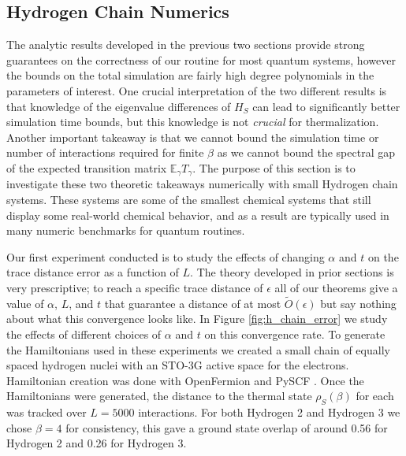 \documentclass[
 amsmath,amssymb,
 aps,
onecolumn, 
nofootinbib]{revtex4-2}
\newcommand{\EE}{\mathbb{E}}
\newcommand{\bigotilde}[1]{\widetilde{O} \left( #1 \right)}
\begin{document}
\subsection{Hydrogen Chain Numerics} \label{sec:general_numerics}

The analytic results developed in the previous two sections provide strong guarantees on the correctness of our routine for most quantum systems, however the bounds on the total simulation are fairly high degree polynomials in the parameters of interest. One crucial interpretation of the two different results is that knowledge of the eigenvalue differences of $H_S$ can lead to significantly better simulation time bounds, but this knowledge is not \emph{crucial} for thermalization. Another important takeaway is that we cannot bound the simulation time or number of interactions required for finite $\beta$ as we cannot bound the spectral gap of the expected transition matrix $\EE_\gamma T_\gamma$. The purpose of this section is to investigate these two theoretic takeaways numerically with small Hydrogen chain systems. These systems are some of the smallest chemical systems that still display some real-world chemical behavior, and as a result are typically used in many numeric benchmarks for quantum routines. 

Our first experiment conducted is to study the effects of changing $\alpha$ and $t$ on the trace distance error as a function of $L$. The theory developed in prior sections is very prescriptive; to reach a specific trace distance of $\epsilon$ all of our theorems give a value of $\alpha$, $L$, and $t$ that guarantee a distance of at most $\bigotilde{\epsilon}$ but say nothing about what this convergence looks like. In Figure \ref{fig:h_chain_error} we study the effects of different choices of $\alpha$ and $t$ on this convergence rate. To generate the Hamiltonians used in these experiments we created a small chain of equally spaced hydrogen nuclei with an STO-3G active space for the electrons. Hamiltonian creation was done with OpenFermion \cite{mcclean2020openfermion} and PySCF \cite{pyscf}. Once the Hamiltonians were generated, the distance to the thermal state $\rho_S(\beta)$ for each was tracked over $L = 5000$ interactions. For both Hydrogen 2 and Hydrogen 3 we chose $\beta = 4$ for consistency, this gave a ground state overlap of around 0.56 for Hydrogen 2 and 0.26 for Hydrogen 3. 
\end{document}
